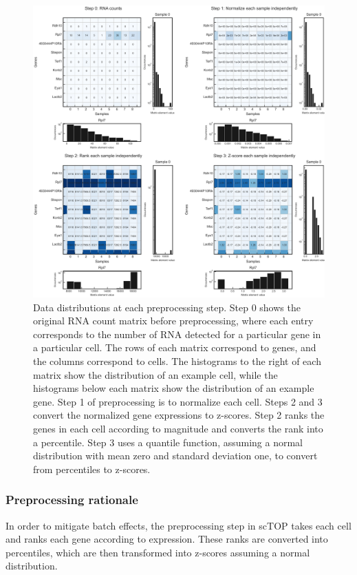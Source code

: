 \documentclass[aps,superscriptaddress, notitlepage,longbibliography]{revtex4-1}
\begin{document}
\begin{figure}
	\centering
		\includegraphics[scale=0.6]{figs/fig1a supplement.pdf}
	\caption{Data distributions at each preprocessing step. Step 0 shows the original RNA count matrix before preprocessing, where each entry corresponds to the number of RNA detected for a particular gene in a particular cell. The rows of each matrix correspond to genes, and the columns correspond to cells. The histograms to the right of each matrix show the distribution of an example cell, while the histograms below each matrix show the distribution of an example gene. Step 1 of preprocessing is to normalize each cell. Steps 2 and 3 convert the normalized gene expressions to z-scores. Step 2 ranks the genes in each cell according to magnitude and converts the rank into a percentile. Step 3 uses a quantile function, assuming a normal distribution with mean zero and standard deviation one, to convert from percentiles to z-scores.}
	\label{FIG:supp1}
\end{figure}

\subsubsection{Preprocessing rationale} 

In order to mitigate batch effects, the preprocessing step in scTOP takes each cell and ranks each gene according to expression. These ranks are converted into percentiles, which are then transformed into z-scores assuming a normal distribution.
    
\end{document}
